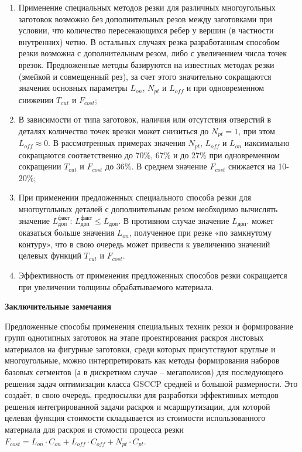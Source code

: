 \documentclass[12pt,twoside]{report}
\begin{document}
\begin{enumerate}
\item Применение специальных методов резки
для различных многоугольных заготовок возможно
без дополнительных резов между заготовками при условии,
что количество пересекающихся ребер у вершин
(в частности внутренних) четно.
В остальных случаях резка разработанным
способом резки возможна с дополнительным резом,
либо с увеличением числа точек врезок.
Предложенные методы базируются на известных методах резки
(змейкой и совмещенный рез),
за счет этого значительно сокращаются
значения основных параметры
$L_{on}$, $N_{pt}$  и $L_{off}$
и   при одновременном снижении
$T_{cut}$
и
$F_{cost}$;

\item В зависимости от типа заготовок,
наличия или отсутствия отверстий в деталях
количество точек врезки может снизиться до
$N_{pt}=1$,
при этом
$L_{off} \approx 0$.
В рассмотренных примерах значения
$N_{pt}$, $L_{off}$ и $L_{on}$
иаксимально сокращаются соответственно до 70\%, 67\% и до 27\%
при одновременном сокращении
$T_{cut}$
и
$F_{cost}$
до 36\%.
В среднем значение $F_{cost}$ снижается на 10-20\%;

\item При применении предложенных специального способа резки
для многоугольных деталей с дополнительным резом
необходимо вычислять значение
$L_\text{доп}^\text{факт}$:
$L_\text{доп}^\text{факт} \leqslant L_\text{доп}$.
В противном случае значение
$L_\text{доп}$.
может оказаться больше значения
$L_{on}$,
полученное при резке «по замкнутому контуру»,
что в свою очередь может привести к увеличению значений целевых функций
$T_{cut}$
и
$F_{cost}$.

\item Эффективность от применения предложенных способов резки
сокращается при увеличении толщины обрабатываемого материала.
\end{enumerate}

{\bf Заключительные замечания}

Предложенные способы применения специальных техник резки и
формирование групп однотипных заготовок на этапе
проектирования раскроя листовых материалов на фигурные заготовки,
среди которых присутствуют круглые и многоугольные,
можно интерпретировать как методы формирования наборов базовых сегментов
(а в дискретном случае – мегаполисов)
для последующего решения задач оптимизации класса GSCCP
средней и большой размерности.
Это создаёт, в свою очередь,
предпосылки  для разработки эффективных методов
решения интегрированной задачи раскроя и мсаршрутизации,
для которой целевая функция стоимости складывается
из стоимости использованного материала для раскроя
и стомости процесса резки
$
F_{cost}=
L_{on} \cdot C_{on} +
L_{off} \cdot C_{off} +
N_{pt} \cdot C_{pt}
$.
\end{document}
